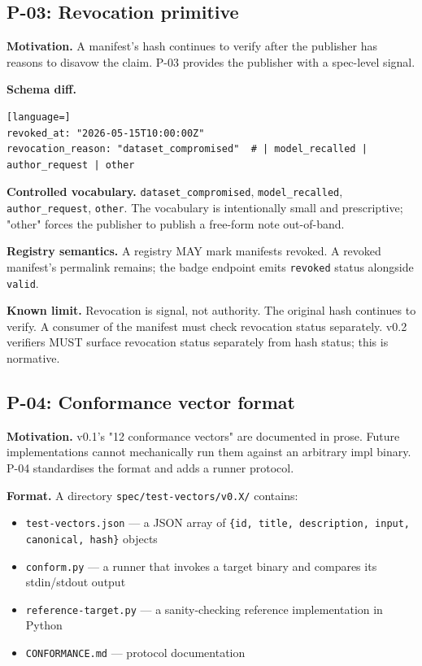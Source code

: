 \documentclass[11pt, a4paper]{article}
\begin{document}
\subsection{P-03: Revocation primitive}
\label{sec:p03}

\textbf{Motivation.} A manifest's hash continues to verify after the publisher has reasons to disavow the claim. P-03 provides the publisher with a spec-level signal.

\textbf{Schema diff.}

\begin{lstlisting}[language=]
revoked_at: "2026-05-15T10:00:00Z"
revocation_reason: "dataset_compromised"  # | model_recalled | author_request | other
\end{lstlisting}

\textbf{Controlled vocabulary.} \texttt{dataset\_compromised}, \texttt{model\_recalled}, \texttt{author\_request}, \texttt{other}. The vocabulary is intentionally small and prescriptive; "other" forces the publisher to publish a free-form note out-of-band.

\textbf{Registry semantics.} A registry MAY mark manifests revoked. A revoked manifest's permalink remains; the badge endpoint emits \texttt{revoked} status alongside \texttt{valid}.

\textbf{Known limit.} Revocation is signal, not authority. The original hash continues to verify. A consumer of the manifest must check revocation status separately. v0.2 verifiers MUST surface revocation status separately from hash status; this is normative.

\subsection{P-04: Conformance vector format}
\label{sec:p04}

\textbf{Motivation.} v0.1's "12 conformance vectors" are documented in prose. Future implementations cannot mechanically run them against an arbitrary impl binary. P-04 standardises the format and adds a runner protocol.

\textbf{Format.} A directory \texttt{spec/test-vectors/v0.X/} contains:

\begin{itemize}[leftmargin=2em, itemsep=0.1em]
  \item \texttt{test-vectors.json} — a JSON array of \texttt{\{id, title, description, input, canonical, hash\}} objects
  \item \texttt{conform.py} — a runner that invokes a target binary and compares its stdin/stdout output
  \item \texttt{reference-target.py} — a sanity-checking reference implementation in Python
  \item \texttt{CONFORMANCE.md} — protocol documentation
\end{itemize}
\end{document}
